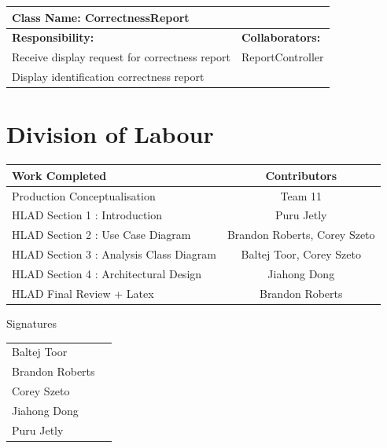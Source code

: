\documentclass[]{article}
\begin{document}
\newpage
	\begin{table}[ht]
		\centering
		\begin{tabular}{|p{5cm}|p{5cm}|}
		\hline 
		 \multicolumn{2}{|l|}{\textbf{Class Name: CorrectnessReport}} \\
		\hline
		\textbf{Responsibility:} & \textbf{Collaborators:} \\
		\hline
		Receive display request for correctness report & ReportController \\
		\hline
		Display identification correctness report &  \\
		\hline
		\end{tabular}
	\end{table}
	
\newpage
\newpage
\appendix
\section{Division of Labour}
\label{sec:division_of_labour}
\begin{center}
\large
			\begin{tabular}{l|c}
				Work Completed   & Contributors \\\hline
				Production Conceptualisation &Team 11 \\
				HLAD Section 1 : Introduction & Puru Jetly \\
				HLAD Section 2 : Use Case Diagram  & Brandon Roberts, Corey Szeto \\
				HLAD Section 3 : Analysis Class Diagram  & Baltej Toor, Corey Szeto  \\
				HLAD Section 4 : Architectural Design  & Jiahong Dong \\
				HLAD Final Review + Latex  & Brandon Roberts \\
			\end{tabular}
			\vspace{0.1in}
\huge Signatures
\end{center}
			\vspace{0.3in}
\large
			\begin{tabular}{l|r}
			\vspace{1in}
				Baltej Toor  & \underline{\hspace{8cm}} \\
			\vspace{1in}
				Brandon Roberts   & \underline{\hspace{8cm}} \\
			\vspace{1in}
				Corey Szeto  & \underline{\hspace{8cm}} \\
			\vspace{1in}
				Jiahong Dong   & \underline{\hspace{8cm}} \\
			\vspace{1in}
				Puru Jetly   & \underline{\hspace{8cm}} \\
			\end{tabular}
\end{document}
